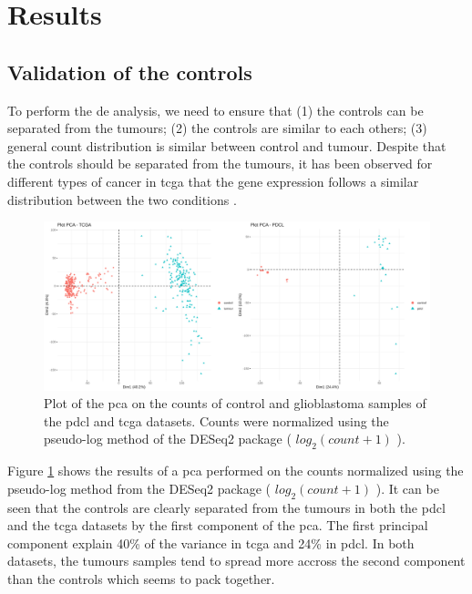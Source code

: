 \section{Results}

\subsection{Validation of the controls}

To perform the \acrlong{de} analysis, we need to ensure that (1) the controls can be separated from the tumours; (2) the controls are similar to each others; (3) general count distribution is similar between control and tumour.
Despite that the controls should be separated from the tumours, it has been observed for different types of cancer in \acrshort{tcga} that the gene expression follows a similar distribution between the two conditions \cite*{Decamps2021}.

\begin{figure}
    \includegraphics[width=\textwidth]{img/pca_plot}
    \caption{
        Plot of the \acrshort{pca} on the counts of control and glioblastoma samples of the \acrshort{pdcl} and \acrshort{tcga} datasets.
        Counts were normalized using the pseudo-log method of the DESeq2 package ( $log_2(count+1)$ ).
    }
    \label{fig:pca-plot}
\end{figure}

Figure \ref*{fig:pca-plot} shows the results of a \acrfull{pca} performed on the counts normalized using the pseudo-log method from the DESeq2 package ( $log_2(count+1)$ ).
It can be seen that the controls are clearly separated from the tumours  in both the \acrshort{pdcl} and the \acrshort{tcga} datasets by the first component of the \acrshort{pca}.
The first principal component explain 40\% of the variance in \acrshort{tcga} and 24\% in \acrshort{pdcl}.
In both datasets, the tumours samples tend to spread more accross the second component than the controls which seems to pack together.

